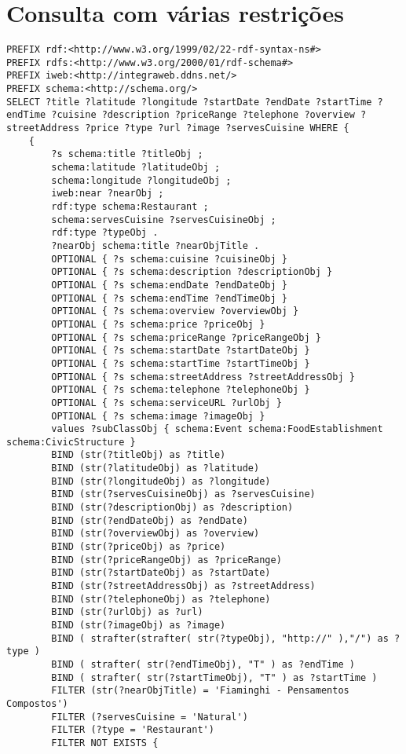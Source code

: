 \chapter{Consulta com várias restrições}
\label{ape:consultas-varias-restricoes}
\begin{lstlisting}[language=SPARQL,basicstyle=\ttfamily\small]
PREFIX rdf:<http://www.w3.org/1999/02/22-rdf-syntax-ns#>
PREFIX rdfs:<http://www.w3.org/2000/01/rdf-schema#>
PREFIX iweb:<http://integraweb.ddns.net/>
PREFIX schema:<http://schema.org/>
SELECT ?title ?latitude ?longitude ?startDate ?endDate ?startTime ?endTime ?cuisine ?description ?priceRange ?telephone ?overview ?streetAddress ?price ?type ?url ?image ?servesCuisine WHERE {
	{
		?s schema:title ?titleObj ;
		schema:latitude ?latitudeObj ;
		schema:longitude ?longitudeObj ;
		iweb:near ?nearObj ; 
		rdf:type schema:Restaurant ;
		schema:servesCuisine ?servesCuisineObj ;
		rdf:type ?typeObj .
		?nearObj schema:title ?nearObjTitle .
		OPTIONAL { ?s schema:cuisine ?cuisineObj }
		OPTIONAL { ?s schema:description ?descriptionObj }
		OPTIONAL { ?s schema:endDate ?endDateObj }
		OPTIONAL { ?s schema:endTime ?endTimeObj }	
		OPTIONAL { ?s schema:overview ?overviewObj }
		OPTIONAL { ?s schema:price ?priceObj }	
		OPTIONAL { ?s schema:priceRange ?priceRangeObj }
		OPTIONAL { ?s schema:startDate ?startDateObj }
		OPTIONAL { ?s schema:startTime ?startTimeObj }
		OPTIONAL { ?s schema:streetAddress ?streetAddressObj }	
		OPTIONAL { ?s schema:telephone ?telephoneObj }
		OPTIONAL { ?s schema:serviceURL ?urlObj }
		OPTIONAL { ?s schema:image ?imageObj }
		values ?subClassObj { schema:Event schema:FoodEstablishment schema:CivicStructure } 
		BIND (str(?titleObj) as ?title)
		BIND (str(?latitudeObj) as ?latitude)
		BIND (str(?longitudeObj) as ?longitude)
		BIND (str(?servesCuisineObj) as ?servesCuisine)
		BIND (str(?descriptionObj) as ?description)
		BIND (str(?endDateObj) as ?endDate)
		BIND (str(?overviewObj) as ?overview)
		BIND (str(?priceObj) as ?price)
		BIND (str(?priceRangeObj) as ?priceRange)
		BIND (str(?startDateObj) as ?startDate)
		BIND (str(?streetAddressObj) as ?streetAddress)
		BIND (str(?telephoneObj) as ?telephone)
		BIND (str(?urlObj) as ?url)
		BIND (str(?imageObj) as ?image)
		BIND ( strafter(strafter( str(?typeObj), "http://" ),"/") as ?type )
		BIND ( strafter( str(?endTimeObj), "T" ) as ?endTime )
		BIND ( strafter( str(?startTimeObj), "T" ) as ?startTime )
		FILTER (str(?nearObjTitle) = 'Fiaminghi - Pensamentos Compostos')
		FILTER (?servesCuisine = 'Natural')
		FILTER (?type = 'Restaurant')
		FILTER NOT EXISTS {

\end{lstlisting}
